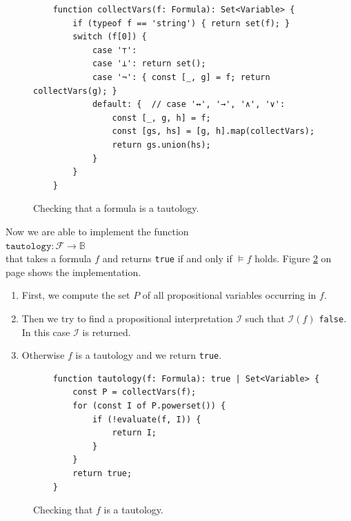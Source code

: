 \begin{figure}[!ht]
  \centering
\begin{verbatim}
    function collectVars(f: Formula): Set<Variable> {
        if (typeof f == 'string') { return set(f); }
        switch (f[0]) {
            case '⊤':
            case '⊥': return set();
            case '¬': { const [_, g] = f; return collectVars(g); }
            default: {  // case '↔', '→', '∧', '∨':
                const [_, g, h] = f;
                const [gs, hs] = [g, h].map(collectVars);
                return gs.union(hs);
            }
        }
    }
\end{verbatim}
\vspace*{-0.3cm}
  \caption{Checking that a formula is a tautology.}
  \label{fig:tautology.py-collectVars}
\end{figure}

Now we are able to implement the function 
\\[0.2cm]
\hspace*{1.3cm}
$\mathtt{tautology}: \mathcal{F} \rightarrow \mathbb{B}$
\\[0.2cm]
that takes a formula $f$ and returns \texttt{true} if and only if $\models f$ holds.
Figure \ref{fig:tautology.py} on page \pageref{fig:tautology.py}
shows the implementation.
\begin{enumerate}
\item First, we compute the set $P$ of all propositional variables occurring in $f$.
\item Then we try to find a propositional interpretation $\mathcal{I}$ such that $\mathcal{I}(f)$
      \texttt{false}.  In this case $\mathcal{I}$ is returned. 
\item Otherwise $f$ is a tautology and we return \texttt{true}.
\end{enumerate}

\begin{figure}[!ht]
  \centering
\begin{verbatim}
    function tautology(f: Formula): true | Set<Variable> {
        const P = collectVars(f);
        for (const I of P.powerset()) {
            if (!evaluate(f, I)) {
                return I;
            }
        }
        return true;
    }                
\end{verbatim}
\vspace*{-0.3cm}
  \caption{Checking that $f$ is a tautology.}
  \label{fig:tautology.py}
\end{figure}


